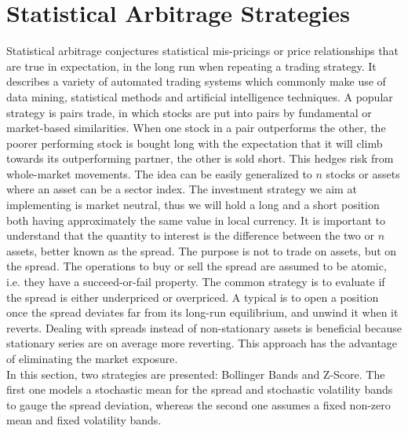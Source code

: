 \documentclass[11pt,a4,twosided,singlespacing,titlepagenumber=on]{scrreprt}
\numberwithin{equation}{chapter} %
\theoremstyle{remark}
\begin{document}
\chapter{Statistical Arbitrage Strategies}
Statistical arbitrage conjectures statistical mis-pricings or price relationships that are true in expectation, in the long run when repeating a trading strategy. It describes a variety of automated trading systems which commonly make use of data mining, statistical methods and artificial intelligence techniques. A popular strategy is pairs trade, in which stocks are put into pairs by fundamental or market-based similarities. When one stock in a pair outperforms the other, the poorer performing stock is bought long with the expectation that it will climb towards its outperforming partner, the other is sold short. This hedges risk from whole-market movements. The idea can be easily generalized to $n$ stocks or assets where an asset can be a sector index. The investment strategy we aim at implementing is market neutral, thus we will hold a long and a short position both having approximately the same value in local currency. It is important to understand that the quantity to interest is the difference between the two or $n$ assets, better known as the spread. The purpose is not to trade on assets, but on the spread. The operations to buy or sell the spread are assumed to be atomic, i.e. they have a succeed-or-fail property. The common strategy is to evaluate if the spread is either underpriced or overpriced. A typical is to open a position once the spread deviates far from its long-run equilibrium, and unwind it when it reverts. Dealing with spreads instead of non-stationary assets is beneficial because stationary series are on average more reverting. This approach has the advantage of eliminating the market exposure. \\ 
In this section, two strategies are presented: Bollinger Bands and Z-Score. The first one models a stochastic mean for the spread and stochastic volatility bands to gauge the spread deviation, whereas the second one assumes a fixed non-zero mean and fixed volatility bands.
\end{document}
